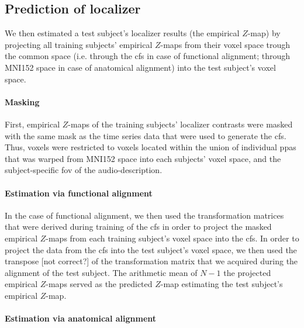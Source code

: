 \subsection{Prediction of localizer}


We then estimated a test subject's localizer results (the empirical $Z$-map) by
projecting all training subjects' empirical $Z$-maps from their voxel space
trough the common space (i.e. through the \ac{cfs} in case of functional
alignment; through MNI152 space in case of anatomical alignment) into the test
subject's voxel space.


\paragraph{Masking}
%
First, empirical $Z$-maps of the training subjects' localizer contrasts were
masked with the same mask as the time series data that were used to generate the
\ac{cfs}.
%
Thus, voxels were restricted to voxels located within the union of individual
\acp{ppa} \citep[s.][]{haeusler2022processing} that was warped from MNI152 space
into each subjects' voxel space, and
the subject-specific \ac{fov} of the audio-description.


\paragraph{Estimation via functional alignment}
In the case of functional alignment, we then used the transformation matrices
that were derived during training of the \ac{cfs} in order to project the masked
empirical $Z$-maps from each training subject's voxel space into the \ac{cfs}.
In order to project the data from the \ac{cfs} into the test subject's voxel
space, we then used the transpose [not correct?] of the transformation matrix that we acquired
during the alignment of the test subject.
The arithmetic mean of $N-1$ the projected empirical $Z$-maps served as the
predicted $Z$-map estimating the test subject's empirical $Z$-map.


\paragraph{Estimation via anatomical alignment}

